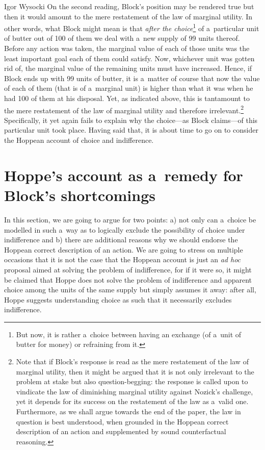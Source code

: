 \begin{artengenv}{Igor Wysocki}
On the second reading, Block's position may be rendered true but then it would amount to the mere restatement of the law of marginal utility. In other words, what Block might mean is that \textit{after the choice}\footnote{But now, it is rather a~choice between having an exchange (of a~unit of butter for money) or refraining from it.} of a~particular unit of butter out of 100 of them we deal with a~new supply of 99 units thereof. Before any action was taken, the marginal value of each of those units was the least important goal each of them could satisfy. Now, whichever unit was gotten rid of, the marginal value of the remaining units must have increased. Hence, if Block ends up with 99 units of butter, it is a~matter of course that now the value of each of them (that is of a~marginal unit) is higher than what it was when he had 100 of them at his disposal. Yet, as indicated above, this is tantamount to the mere restatement of the law of marginal utility and therefore irrelevant.\footnote{Note that if Block's response is read as the mere restatement of the law of marginal utility, then it might be argued that it is not only irrelevant to the problem at stake but also question-begging: the response is called upon to vindicate the law of diminishing marginal utility against Nozick's challenge, yet it depends for its success on the restatement of the law as a~valid one. Furthermore, as we shall argue towards the end of the paper, the law in question is best understood, when grounded in the Hoppean correct description of an action and supplemented by sound counterfactual reasoning.} Specifically, it yet again fails to explain why the choice---as Block claims---of this particular unit took place. Having said that, it is about time to go on to consider the Hoppean account of choice and indifference.

\section{Hoppe's account as a~remedy for Block's shortcomings }
In this section, we are going to argue for two points: a) not only can a~choice be modelled in such a~way as to logically exclude the possibility of choice under indifference and b) there are additional reasons why we should endorse the Hoppean correct description of an action. We are going to stress on multiple occasions that it is not the case that the Hoppean account is just an \textit{ad hoc} proposal aimed at solving the problem of indifference, for if it were so, it might be claimed that Hoppe does not solve the problem of indifference and apparent choice among the units of the same supply but simply assumes it away: after all, Hoppe suggests understanding choice as such that it necessarily excludes indifference.


\end{artengenv}
